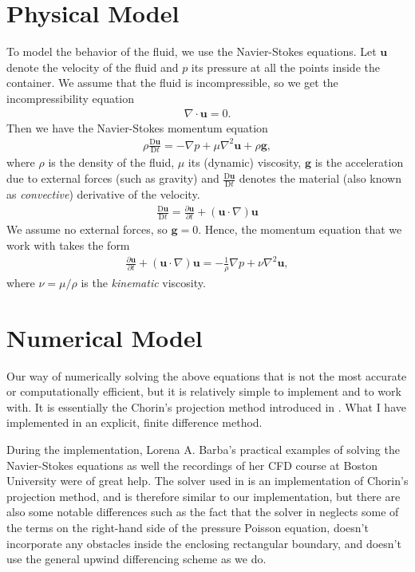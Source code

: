 \documentclass[11pt,a4paper,twoside,openright]{report}
\begin{document}
\section{Physical Model}
To model the behavior of the fluid, we use the Navier-Stokes equations. Let $\mathbf u$ denote the velocity of the fluid and $p$ its pressure at all the points inside the container. We assume that the fluid is incompressible, so we get the incompressibility equation
\newcommand{\uu}{\mathbf u}
\newcommand{\D}{\mathrm D}
\begin{align}\label{eq:incom}
	\nabla\cdot\uu=0.
\end{align}
Then we have the Navier-Stokes momentum equation
\newcommand{\conv}{\frac{\D\uu}{\D t}}
\begin{align*}
	\rho\conv=-\nabla p+\mu\nabla^2\uu+\rho\mathbf g,
\end{align*}
where $\rho$ is the density of the fluid, $\mu$ its (dynamic) viscosity, $\mathbf g$ is the acceleration due to external forces (such as gravity) and $\conv$ denotes the material (also known as \emph{convective}) derivative of the velocity.
\newcommand{\pder}[2]{\frac{\partial #1}{\partial #2}}
\begin{align*}
	\conv=\pder\uu t+(\uu\cdot\nabla)\uu
\end{align*}
We assume no external forces, so $\mathbf g=0$. Hence, the momentum equation that we work with takes the form
\begin{align}\label{eq:momentum}
	\pder\uu t+(\uu\cdot\nabla)\uu=-\frac1\rho\nabla p+\nu\nabla^2\uu,
\end{align}
where $\nu=\mu/\rho$ is the \emph{kinematic} viscosity.
\section{Numerical Model}
Our way of numerically solving the above equations that is not the most accurate or computationally efficient, but it is relatively simple to implement and to work with. It is essentially the Chorin's projection method introduced in \cite{Chorin}. What I have implemented in an explicit, finite difference method.

During the implementation, Lorena A. Barba's practical examples of solving the Navier-Stokes equations \cite{CFDpython} as well the recordings of her CFD course at Boston University \cite{BarbaCourse} were of great help. The solver used in \cite{CFDpython} is an implementation of Chorin's projection method, and is therefore similar to our implementation, but there are also some notable differences such as the fact that the solver in \cite{CFDpython} neglects some of the terms on the right-hand side of the pressure Poisson equation, doesn't incorporate any obstacles inside the enclosing rectangular boundary, and doesn't use the general upwind differencing scheme as we do.
\end{document}

